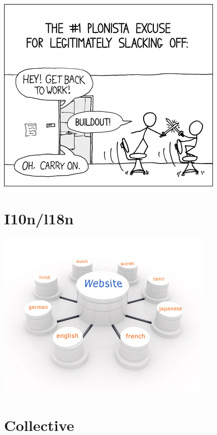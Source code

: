 \documentclass[arial,pdftex]{beamer}
\begin{document}
\begin{frame}
  \begin{center}
    \includegraphics[height=0.7\textheight]{xkcd-buildout.png}
  \end{center}
\end{frame}

\section{I10n/l18n}
\begin{frame}
  \begin{center}
    \includegraphics[height=0.7\textheight]{i18n.png}
  \end{center}
\end{frame}

\section{Collective}
\end{document}
